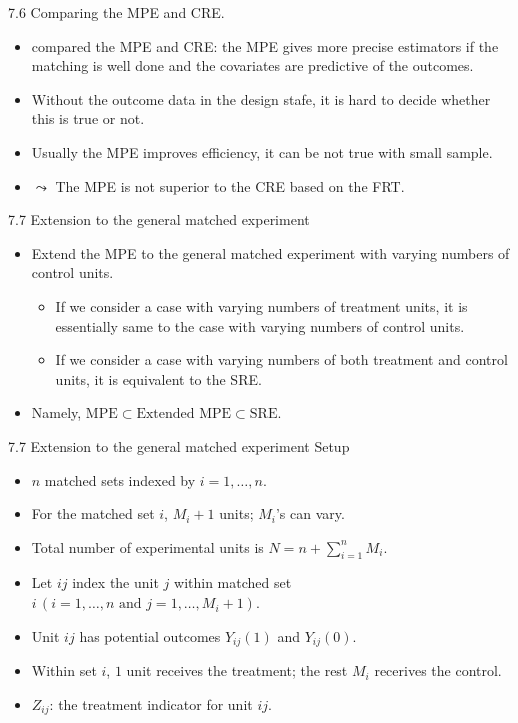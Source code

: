 \documentclass[aspectratio=169, 12pt]{beamer}
\begin{document}
\begin{frame}{7.6 Comparing the MPE and CRE.}
    \begin{itemize}
        \item \citet{imai2008variance} compared the MPE and CRE: the MPE gives more precise estimators if the matching is well done and the covariates are predictive of the outcomes.
        \item Without the outcome data in the design stafe, it is hard to decide whether this is true or not.
        \item Usually the MPE improves efficiency, it can be not true with small sample.
        \item $\leadsto$ The MPE is not superior to the CRE based on the FRT.
    \end{itemize}
\end{frame}

\begin{frame}{7.7 Extension to the general matched experiment}
    \begin{itemize}
        \item Extend the MPE to the general matched experiment with varying numbers of control units.
        \begin{itemize}
            \item If we consider a case with varying numbers of treatment units, it is essentially same to the case with varying numbers of control units.
            \item If we consider a case with varying numbers of both treatment and control units, it is equivalent to the SRE.
        \end{itemize}
        \item Namely, $\text{MPE}\subset\text{Extended MPE}\subset\text{SRE}.$
    \end{itemize}
\end{frame}

\begin{frame}{7.7 Extension to the general matched experiment}
    Setup
    \begin{itemize}
        \item $n$ matched sets indexed by $i=1,\dots,n$.
        \item For the matched set $i$, $M_i+1$ units; $M_i$'s can vary.
        \item Total number of experimental units is $N=n+\sum_{i=1}^{n}M_i$.
        \item Let $ij$ index the unit $j$ within matched set $i\,(i=1,\dots,n\text{ and }j=1,\dots,M_i+1)$.
        \item Unit $ij$ has potential outcomes $Y_{ij}(1)$ and $Y_{ij}(0)$.
        \item Within set $i$, $1$ unit receives the treatment; the rest $M_i$ recerives the control.
        \item $Z_{ij}$: the treatment indicator for unit $ij$.
    \end{itemize}
\end{frame}
\end{document}

